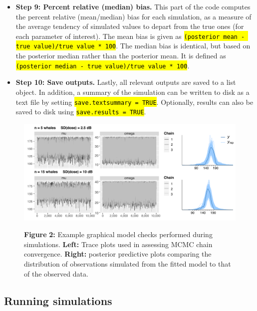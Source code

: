 \documentclass[
]{article}
\begin{document}
\begin{itemize}
\item
  \textbf{Step 9: Percent relative (median) bias.} This part of the code computes the percent relative (mean/median) bias for each simulation, as a measure of the average tendency of simulated values to depart from the true ones (for each parameter of interest). The mean bias is given as \textcolor{codecolor}{\texttt{\hl{(posterior mean - true value)/true value * 100}}}. The median bias is identical, but based on the posterior median rather than the posterior mean. It is defined as \textcolor{codecolor}{\texttt{\hl{(posterior median - true value)/true value * 100}}}.
\item
  \textbf{Step 10: Save outputs.} Lastly, all relevant outputs are saved to a list object. In addition, a summary of the simulation can be written to disk as a text file by setting \textcolor{codecolor}{\texttt{\hl{save.textsummary = TRUE}}}. Optionally, results can also be saved to disk using \textcolor{codecolor}{\texttt{\hl{save.results = TRUE}}}.
\end{itemize}



\begin{figure}

{\centering \includegraphics[width=1\linewidth]{fig/fig_graphical_checks} 

}

\textbf{Figure }{\textbf{2:} \hypertarget{fig2}{}Example graphical model checks performed during simulations. \textbf{Left:} Trace plots used in assessing MCMC chain convergence. \textbf{Right:} posterior predictive plots comparing the distribution of observations simulated from the fitted model to that of the observed data.}\label{fig:unnamed-chunk-5}
\end{figure}

\subsection{Running simulations}
\end{document}
